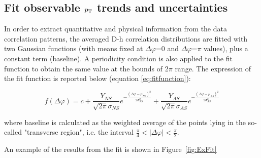 
\subsection{Fit observable $p_{\rm T}$ trends and uncertainties}


In order to extract quantitative and physical information from the data correlation patterns, the averaged D-h correlation distributions are fitted with two Gaussian functions (with means fixed at $\Delta\varphi$=0 and $\Delta\varphi$=$\pi$ values), plus a constant term (baseline). A periodicity condition is also applied to the fit function to obtain the same value at the bounds of 2$\pi$ range. The expression of the fit function is reported below (equation \ref{eq:fitfunction}):

\begin{equation}
f\left(\Delta\varphi\right) = c + \frac{Y_{NS}}{\sqrt{2\pi}\sigma_{NS}}e^{-\frac{\left(\Delta\varphi-\mu_{NS}\right)^{2}}{2\sigma_{NS}^{2}}} + \frac{Y_{AS}}{\sqrt{2\pi}\sigma_{AS}}e^{-\frac{\left(\Delta\varphi-\mu_{AS}\right)^{2}}{2\sigma_{AS}^{2}}}
\label{eq:fitfunction}
\end{equation}

where baseline is calculated as the weighted average of the points lying in the so-called "transverse region", i.e. the interval $\frac{\pi}{4}<|\Delta\varphi|<\frac{\pi}{2}$.

An example of the results from the fit is shown in Figure~\ref{fig:ExFit}




